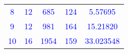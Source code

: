 \begin{frame}
\begin{table}[ht]
\begin{tabular}{|c | c | c | c | c |}
\tiny{\textcolor{blue}{8}} & \tiny{\textcolor{blue}{12}} & \tiny{\textcolor{blue}{685}} & \tiny{\textcolor{blue}{124}} & \tiny{\textcolor{blue}{5.57695}}\\

\tiny{\textcolor{blue}{9}} & \tiny{\textcolor{blue}{12}} & \tiny{\textcolor{blue}{981}} & \tiny{\textcolor{blue}{164}} & \tiny{\textcolor{blue}{15.21820}} \\

\tiny{\textcolor{blue}{10}} & \tiny{\textcolor{blue}{16}} & \tiny{\textcolor{blue}{1954}} & \tiny{\textcolor{blue}{159}} & \tiny{\textcolor{blue}{33.023548}}\\


\hline

\end{tabular}
\label{table:nonlin}

\end{table}

 
\end{frame}

